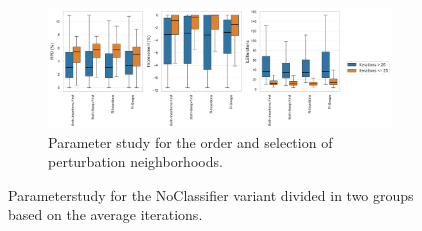 \begin{figure}[!ht]
\begin{subfigure}[t]{0.83\textwidth}
	\end{subfigure}
	\begin{subfigure}[t]{0.83\textwidth}
		\centering
		\caption{Parameter study for the order and selection of perturbation neighborhoods.}
		\includegraphics[width=\textwidth]{pictures/parameter_study/PerturbationTypes_base_parameter_study.png}
	\end{subfigure}
	\caption{Parameterstudy for the NoClassifier variant divided in two groups based on the average iterations.}
\end{figure}


\FloatBarrier

